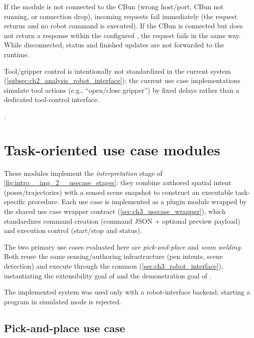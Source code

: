 If the module is not connected to the CBun (wrong host/port, CBun not running, or connection drop), incoming  requests fail immediately (the request returns  and no robot command is executed).
If the CBun is connected but does not return a response within the configured , the request fails in the same way.
While disconnected, status and finished updates are not forwarded to the runtime.

Tool/gripper control is intentionally not standardized in the current system (\autoref{subsec:ch2_analysis_robot_interface}); the current use case implementations simulate tool actions (e.g., ``open/close gripper'') by fixed delays rather than a dedicated tool-control interface.

.

\section{Task-oriented use case modules}
\label{sec:ch4_usecases}

These modules implement the \emph{interpretation} stage of \autoref{fig:intro__img_2__usecase_stages}:
they combine authored spatial intent (poses/trajectories) with a sensed scene snapshot to construct an executable task-specific procedure.
Each use case is implemented as a plugin module wrapped by the shared use case wrapper contract (\autoref{sec:ch3_usecase_wrapper}), which standardizes command creation (command JSON + optional preview payload) and execution control (start/stop and status).

The two primary use cases evaluated here are \emph{pick-and-place} and \emph{seam welding}. Both reuse the same sensing/authoring infrastructure (pen intents, scene detection) and execute through the common  (\autoref{sec:ch3_robot_interface}), instantiating the extensibility goal of  and the demonstration goal of .

The implemented system was used only with a robot-interface backend; starting a program in simulated mode is rejected.

\subsection{Pick-and-place use case}
\label{subsec:ch4_usecase_pick_place}

